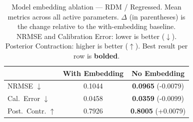 \begin{table}[t]
\centering
\caption{Model embedding ablation — RDM / Regressed. Mean metrics across
all active parameters. $\Delta$ (in parentheses) is the change relative to the
with-embedding baseline. NRMSE and Calibration Error: lower is better ($\downarrow$).
Posterior Contraction: higher is better ($\uparrow$). Best result per row is
\textbf{bolded}.}
\label{tab:embed_ablation_rdm_regressed}
\begin{tabular}{lcc}
\toprule
 & With Embedding & No Embedding \\
\midrule
NRMSE $\downarrow$ & 0.1044 & \textbf{0.0965} \small{(-0.0079)} \\
Cal.\ Error $\downarrow$ & 0.0458 & \textbf{0.0359} \small{(-0.0099)} \\
Post.\ Contr. $\uparrow$ & 0.7926 & \textbf{0.8005} \small{(+0.0079)} \\
\bottomrule
\end{tabular}
\end{table}